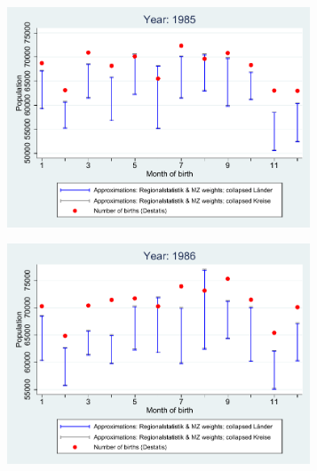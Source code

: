 \documentclass[a4paper ]{article}
\begin{document}
\begin{figure}[h]
\centering
\caption{Reform 2: 1985 - 1989}
\begin{subfigure}[t]{0.48\textwidth}
		\centering
		\includegraphics[width=0.99\textwidth]{comparison_population_1985.pdf}		
\end{subfigure}
\begin{subfigure}[t]{0.48\textwidth}
		\centering
		\includegraphics[width=0.99\textwidth]{comparison_population_1986.pdf}		
\end{subfigure}
\begin{subfigure}[t]{0.48\textwidth}
		\centering

\end{subfigure}
\end{figure}
\end{document}
